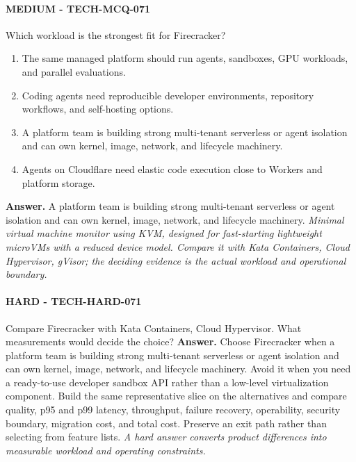 \paragraph{MEDIUM - TECH-MCQ-071} Which workload is the strongest fit for Firecracker?
\begin{enumerate}[label=\Alph*.]
\item The same managed platform should run agents, sandboxes, GPU workloads, and parallel evaluations.
\item Coding agents need reproducible developer environments, repository workflows, and self-hosting options.
\item A platform team is building strong multi-tenant serverless or agent isolation and can own kernel, image, network, and lifecycle machinery.
\item Agents on Cloudflare need elastic code execution close to Workers and platform storage.
\end{enumerate}
\textbf{Answer.} A platform team is building strong multi-tenant serverless or agent isolation and can own kernel, image, network, and lifecycle machinery.
\textit{Minimal virtual machine monitor using KVM, designed for fast-starting lightweight microVMs with a reduced device model. Compare it with Kata Containers, Cloud Hypervisor, gVisor; the deciding evidence is the actual workload and operational boundary.}
\paragraph{HARD - TECH-HARD-071} Compare Firecracker with Kata Containers, Cloud Hypervisor. What measurements would decide the choice?
\textbf{Answer.} Choose Firecracker when a platform team is building strong multi-tenant serverless or agent isolation and can own kernel, image, network, and lifecycle machinery. Avoid it when you need a ready-to-use developer sandbox API rather than a low-level virtualization component. Build the same representative slice on the alternatives and compare quality, p95 and p99 latency, throughput, failure recovery, operability, security boundary, migration cost, and total cost. Preserve an exit path rather than selecting from feature lists.
\textit{A hard answer converts product differences into measurable workload and operating constraints.}
